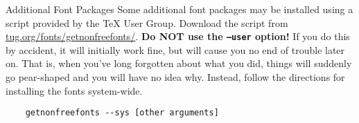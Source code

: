 \begin{frame}{Additional Font Packages}
  Some additional font packages may be installed using a script provided by the \TeX{} User Group.
  Download the script from \url{tug.org/fonts/getnonfreefonts/}.
  \textbf{Do NOT use the \texttt{--user} option!}
  If you do this by accident, it will initially work fine, but will cause you no end of trouble later on.
  That is, when you've long forgotten about what you did, things will suddenly go pear-shaped and you will have no idea why.
  Instead, follow the directions for installing the fonts system-wide. 
  \begin{verbatim}
    getnonfreefonts --sys [other arguments]
  \end{verbatim}
\end{frame}





